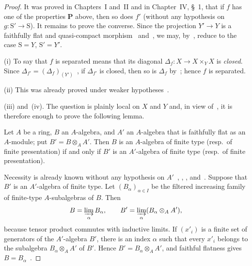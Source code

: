 \begin{proof}
It was proved in Chapters~I and~II and in Chapter~IV, \S~1, that if
$f$ has one of the properties $\boldsymbol{P}$ above, then so does $f'$
\textnormal{(}without any hypothesis on $g:\mathrm{S}'\to\mathrm{S}$\textnormal{)}.
It remains to prove the converse. Since the projection $Y'\to Y$ is
a faithfully flat and quasi-compact morphism~
and~, we may, by~, reduce to the
case $\mathrm{S}=Y$, $\mathrm{S}'=Y'$.

\textnormal{(i)} To say that $f$ is separated means that its diagonal
$\Delta_f:X\to X\times_Y X$ is \emph{closed}. Since
$\Delta_{f'}=(\Delta_f)_{(Y')}$~, if
$\Delta_{f'}$ is closed, then so is $\Delta_f$ by~;
hence $f$ is separated.

\textnormal{(ii)} This was already proved under weaker
hypotheses~.

\textnormal{(iii)} and~\textnormal{(iv)}. The question is plainly local
on $X$ and $Y$ and, in view of~, it is therefore enough
to prove the following lemma.

\begin{lemma}[2.7.1.1]
\label{IV.2.7.1.1}
Let $A$ be a ring, $B$ an $A$-algebra, and $A'$ an $A$-algebra that
is faithfully flat as an $A$-module; put $B'=B\otimes_A A'$. Then $B$
is an $A$-algebra of finite type \textup{(resp.}\ of finite
presentation\textnormal{)} if and only if $B'$ is an $A'$-algebra of
finite type \textup{(resp.}\ of finite presentation\textnormal{)}.
\end{lemma}

Necessity is already known without any hypothesis on
$A'$~, , ,
and~. Suppose that $B'$ is an $A'$-algebra of finite
type. Let $(B_\alpha)_{\alpha\in I}$ be the filtered increasing family
of finite-type $A$-subalgebras of $B$. Then
\[
  B=\varinjlim_\alpha B_\alpha,\qquad
  B'=\varinjlim_\alpha(B_\alpha\otimes_A A'),
\]
because tensor product commutes with inductive limits. If
$(x'_i)$ is a finite set of generators of the $A'$-algebra $B'$, there
is an index $\alpha$ such that every $x'_i$ belongs to the subalgebra
$B_\alpha\otimes_A A'$ of $B'$. Hence
$B'=B_\alpha\otimes_A A'$, and faithful flatness gives
$B=B_\alpha$~.


\end{proof}
